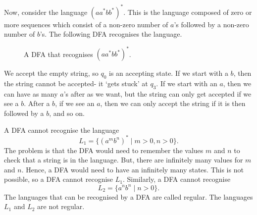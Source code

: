 \documentclass[a4paper, openany]{memoir}
\begin{document}
Now, consider the language $(aa^* bb^*)^*$. This is the language composed of zero or more sequences which consist of a non-zero number of $a$'s followed by a non-zero number of $b$'s. The following DFA recognises the language.
\begin{figure}[H]
    \centering
    \caption{A DFA that recognises $(aa^*bb^*)^*$.}
\end{figure}
\noindent We accept the empty string, so $q_0$ is an accepting state. If we start with a $b$, then the string cannot be accepted- it `gets stuck' at $q_3$. If we start with an $a$, then we can have as many $a$'s after as we want, but the string can only get accepted if we see a $b$. After a $b$, if we see an $a$, then we can only accept the string if it is then followed by a $b$, and so on.

A DFA cannot recognise the language
\[L_1 = \{(a^m b^n)^* \mid m > 0, n > 0\}.\]
The problem is that the DFA would need to remember the values $m$ and $n$ to check that a string is in the language. But, there are infinitely many values for $m$ and $n$. Hence, a DFA would need to have an infinitely many states. This is not possible, so a DFA cannot recognise $L_1$. Similarly, a DFA cannot recognise
\[L_2 = \{a^n b^n \mid n > 0\}.\]
The languages that can be recognised by a DFA are called regular. The languages $L_1$ and $L_2$ are not regular.
\end{document}
